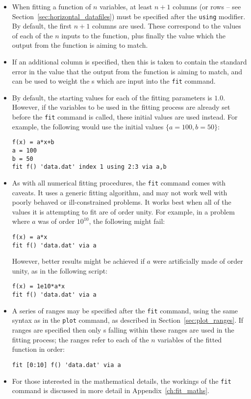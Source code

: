 \begin{itemize}
\item When fitting a function of $n$ variables, at least $n+1$ columns (or
rows -- see Section~\ref{sec:horizontal_datafiles}) must be specified after the
{\tt using} modifier. By default, the first $n+1$ columns are used. These
correspond to the values of each of the $n$ inputs to the function, plus
finally the value which the output from the function is aiming to match.
\item If an additional column is specified, then this is taken to contain the
standard error in the value that the output from the function is aiming to
match, and can be used to weight the \datapoint s which are input into the
{\tt fit} command.
\item By default, the starting values for each of the fitting parameters is
$1.0$. However, if the variables to be used in the fitting process are already
set before the {\tt fit} command is called, these initial values are used
instead. For example, the following would use the initial values
$\{a=100,b=50\}$:
\begin{verbatim}
f(x) = a*x+b
a = 100
b = 50
fit f() 'data.dat' index 1 using 2:3 via a,b
\end{verbatim}

\item As with all numerical fitting procedures, the {\tt fit} command comes
with caveats. It uses a generic fitting algorithm, and may not work well with
poorly behaved or ill-constrained problems. It works best when all of the
values it is attempting to fit are of order unity. For example, in a problem
where $a$ was of order $10^{10}$, the following might fail:
\begin{verbatim}
f(x) = a*x
fit f() 'data.dat' via a
\end{verbatim}
However, better results might be achieved if $a$ were artificially made of
order unity, as in the following script:
\begin{verbatim}
f(x) = 1e10*a*x
fit f() 'data.dat' via a
\end{verbatim}

\item A series of ranges may be specified after the {\tt fit} command, using
the same syntax as in the {\tt plot} command, as described in
Section~\ref{sec:plot_ranges}. If ranges are specified then only \datapoint s
falling within these ranges are used in the fitting process; the ranges refer
to each of the $n$ variables of the fitted function in order:
\begin{verbatim}
fit [0:10] f() 'data.dat' via a
\end{verbatim}

\item For those interested in the mathematical details, the workings of the
{\tt fit} command is discussed in more detail in Appendix~\ref{ch:fit_maths}.

\end{itemize}

